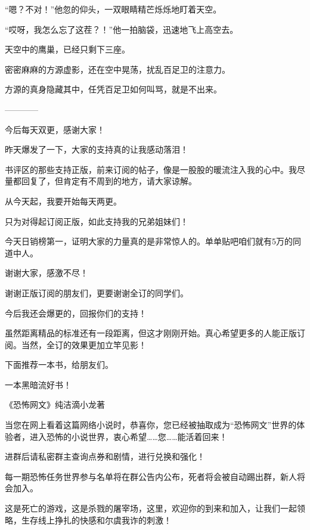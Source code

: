 \begin{this_body}
“嗯？不对！”他忽的仰头，一双眼睛精芒烁烁地盯着天空。

“哎呀，我怎么忘了这茬？！”他一拍脑袋，迅速地飞上高空去。

天空中的鹰巢，已经只剩下三座。

密密麻麻的方源虚影，还在空中晃荡，扰乱百足卫的注意力。

方源的真身隐藏其中，任凭百足卫如何叫骂，就是不出来。

------------

今后每天双更，感谢大家！

昨天爆发了一下，大家的支持真的让我感动落泪！

书评区的那些支持正版，前来订阅的帖子，像是一股股的暖流注入我的心中。我尽量都回复了，但肯定有不周到的地方，请大家谅解。

从今天起，我要开始每天两更。

只为对得起订阅正版，如此支持我的兄弟姐妹们！

今天日销榜第一，证明大家的力量真的是非常惊人的。单单贴吧咱们就有5万的同道中人。

谢谢大家，感激不尽！

谢谢正版订阅的朋友们，更要谢谢全订的同学们。

今后我还会爆更的，回报你们的支持！

虽然距离精品的标准还有一段距离，但这才刚刚开始。真心希望更多的人能正版订阅。当然，全订的效果更加立竿见影！

下面推荐一本书，给朋友们。

一本黑暗流好书！

《恐怖网文》纯洁滴小龙著

当您在网上看着这篇网络小说时，恭喜你，您已经被抽取成为“恐怖网文”世界的体验者，进入恐怖的小说世界，衷心希望……您……能活着回来！

进群后请私密群主查询点券和剧情，进行兑换和强化！

每一期恐怖任务世界参与名单将在群公告内公布，死者将会被自动踢出群，新人将会加入。

这是死亡的游戏，这是杀戮的屠宰场，这里，欢迎你的到来和加入，让我们一起领略，生存线上挣扎的快感和尔虞我诈的刺激！

\end{this_body}

